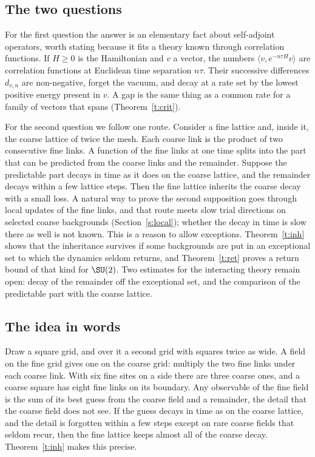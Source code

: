 \subsection{The two questions}
For the first question the answer is an elementary fact about self-adjoint operators, worth stating because
it fits a theory known through correlation functions. If $H\ge0$ is the Hamiltonian and $v$ a vector, the
numbers $\langle v,e^{-n\tau H}v\rangle$ are correlation functions at Euclidean time separation $n\tau$. Their
successive differences $d_{v,n}$ are non-negative, forget the vacuum, and decay at a rate set by the lowest
positive energy present in $v$. A gap is the same thing as a common rate for a family of vectors that spans
(Theorem~\ref{t:crit}).

For the second question we follow one route. Consider a fine lattice and, inside it, the coarse lattice of
twice the mesh. Each coarse link is the product of two consecutive fine links. A function of the fine links at
one time splits into the part that can be predicted from the coarse links and the remainder. Suppose the
predictable part decays in time as it does on the coarse lattice, and the remainder decays within a few
lattice steps. Then the fine lattice inherits the coarse decay with a small loss. A natural way to prove the second supposition goes through local updates of the fine links, and that
route meets slow trial directions on selected coarse backgrounds (Section~\ref{s:local}); whether the decay
in time is slow there as well is not known. This is a reason to allow exceptions. Theorem~\ref{t:inh} shows
that the inheritance survives if some backgrounds are put in an exceptional set to which the dynamics seldom
returns,
and Theorem~\ref{t:ret} proves a return bound of that kind for $\SU(2)$. Two estimates for the interacting
theory remain open: decay of the remainder off the exceptional set, and the comparison of the predictable
part with the coarse lattice.

\subsection{The idea in words}
Draw a square grid, and over it a second grid with squares twice as wide. A field on the fine grid gives one
on the coarse grid: multiply the two fine links under each coarse link. With six fine sites on a side there
are three coarse ones, and a coarse square has eight fine links on its boundary. Any observable of the fine
field is the sum of its best guess from the coarse field and a remainder, the detail that the coarse field
does not see. If the guess decays in time as on the coarse lattice, and the detail is forgotten within a few
steps except on rare coarse fields that seldom recur, then the fine lattice keeps almost all of the coarse
decay. Theorem~\ref{t:inh} makes this precise.

